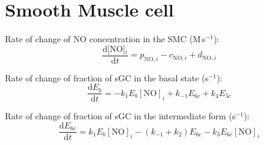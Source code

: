 \documentclass[fleqn]{report}
\numberwithin{equation}{section}
\numberwithin{equation}{section}
\newcommand{\NO}{\text{NO}}
\newcommand{\NOi}{\text{[NO]$_i$}}
\newcommand{\uMpers}{\textmu M\,s$^{-1}$}
\newcommand{\n}{$^{-1}$}
\newcommand\pNO[1]{\text{$p_{\text{NO},#1}$}}
\newcommand\cNO[1]{\text{$c_{\text{NO},#1}$}}
\newcommand\dNO[1]{\text{$d_{\text{NO},#1}$}}
\begin{document}
\section{Smooth Muscle cell}
		Rate of change of NO concentration in the SMC (\uMpers):
				    \begin{equation}  
		      			 \dfrac{\mathrm{d}\NOi}{\mathrm{d}t} = \pNO{i} - \cNO{i} + \dNO{i} 
					\end{equation}
					
					Rate of change of fraction of sGC in the basal state (s\n):%
					\begin{equation} 
						\dfrac{\mathrm{d}E_b}{\mathrm{d}t} = -k_1 E_b [\NO]_i + k_{-1} E_{6c} + k_4 E_{5c}
					\end{equation}	
					
					Rate of change of fraction of sGC in the intermediate form (s\n):%
					\begin{equation} 
						\dfrac{\mathrm{d}E_{6c}}{\mathrm{d}t} = k_1 E_b [\NO]_i - (k_{-1} + k_2) E_{6c} - k_3 E_{6c} [\NO]_i
					\end{equation}	
		
\end{document}

